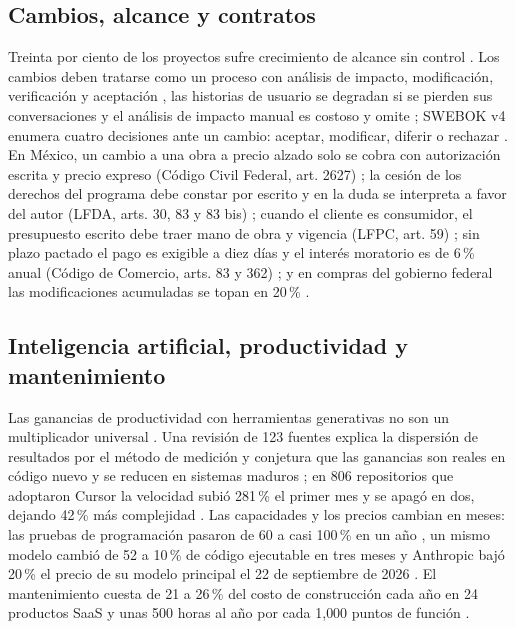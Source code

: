 \documentclass[10pt,twocolumn]{article}
\begin{document}
\subsection{Cambios, alcance y contratos}
Treinta por ciento de los proyectos sufre crecimiento de alcance sin control \cite{institute2024pulse}. Los cambios deben tratarse como un proceso con análisis de impacto, modificación, verificación y aceptación \cite{kong2025requirements}, las historias de usuario se degradan si se pierden sus conversaciones \cite{sporsem2025} y el análisis de impacto manual es costoso y omite \cite{etezadi2025}; SWEBOK v4 enumera cuatro decisiones ante un cambio: aceptar, modificar, diferir o rechazar \cite{society2026guide}. En México, un cambio a una obra a precio alzado solo se cobra con autorización escrita y precio expreso (Código Civil Federal, art. 2627) \cite{union2025codigo}; la cesión de los derechos del programa debe constar por escrito y en la duda se interpreta a favor del autor (LFDA, arts. 30, 83 y 83 bis) \cite{union2026ley}; cuando el cliente es consumidor, el presupuesto escrito debe traer mano de obra y vigencia (LFPC, art. 59) \cite{union2025ley}; sin plazo pactado el pago es exigible a diez días y el interés moratorio es de 6\,\% anual (Código de Comercio, arts. 83 y 362) \cite{union2025codigo2}; y en compras del gobierno federal las modificaciones acumuladas se topan en 20\,\% \cite{union2025ley2}.

\subsection{Inteligencia artificial, productividad y mantenimiento}
Las ganancias de productividad con herramientas generativas no son un multiplicador universal \cite{cui2025,becker2025}. Una revisión de 123 fuentes explica la dispersión de resultados por el método de medición y conjetura que las ganancias son reales en código nuevo y se reducen en sistemas maduros \cite{michels2026vibe}; en 806 repositorios que adoptaron Cursor la velocidad subió 281\,\% el primer mes y se apagó en dos, dejando 42\,\% más complejidad \cite{he2026speed}. Las capacidades y los precios cambian en meses: las pruebas de programación pasaron de 60 a casi 100\,\% en un año \cite{committee2026ai}, un mismo modelo cambió de 52 a 10\,\% de código ejecutable en tres meses \cite{chen2024is} y Anthropic bajó 20\,\% el precio de su modelo principal el 22 de septiembre de 2026 \cite{anthropic2026introducing}. El mantenimiento cuesta de 21 a 26\,\% del costo de construcción cada año en 24 productos SaaS \cite{riedl2026what} y unas 500 horas al año por cada 1{,}000 puntos de función \cite{group2023analysis}.
\end{document}
